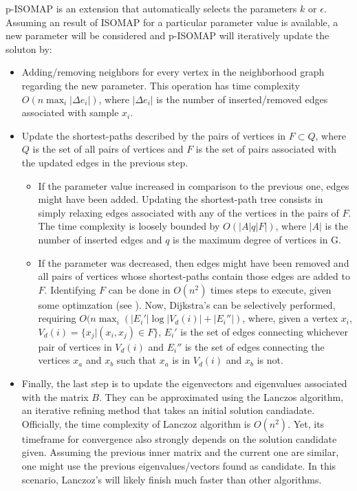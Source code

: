 \documentclass[12pt]{report}
\begin{document}
p-ISOMAP is an extension that automatically selects the parameters $k$ or $\epsilon$. \cite{choo2010p} Assuming an result of ISOMAP for a particular parameter value is available, a new parameter will be considered and p-ISOMAP will iteratively update the soluton by:
\begin{itemize}
	\item Adding/removing neighbors for every vertex in the neighborhood graph regarding the new parameter. This operation has time complexity $O(n \max_i |\Delta e_i|)$, where $|\Delta e_i|$ is the number of inserted/removed edges associated with sample $x_i$.
	
	\item Update the shortest-paths described by the pairs of vertices in $F \subset Q$, where $Q$ is the set of all pairs of vertices and $F$ is the set of pairs associated with the updated edges in the previous step.
	\begin{itemize}
		\item	If the parameter value increased in comparison to the previous one, edges might have been added. Updating the shortest-path tree consists in simply relaxing edges associated with any of the vertices in the pairs of $F$. The time complexity is loosely bounded by $O(|A|q|F|)$, where $|A|$ is the number of inserted edges and $q$ is the maximum degree of vertices in G.
		
		\item If the parameter was decreased, then edges might have been removed and all pairs of vertices whose shortest-paths contain those edges are added to $F$. Identifying $F$ can be done in $O(n^2)$ times steps to execute, given some optimzation (see \cite{choo2010p}). Now, Dijkstra's can be selectively performed, requiring $O(n \max_i (|E_i'| \log |V_d(i)| + |E_i''|)$, where, given a vertex $x_i$, $V_d(i)=\{x_j | (x_i, x_j) \in F\}$, $E_i'$ is the set of edges connecting whichever pair of vertices in $V_d(i)$ and $E_i''$ is the set of edges connecting the vertices $x_a$ and $x_b$ such that $x_a$ is in $V_d(i)$ and $x_b$ is not.
	\end{itemize}

	\item Finally, the last step is to update the eigenvectors and eigenvalues associated with the matrix $B$. They can be approximated using the Lanczos algorithm, an iterative refining method that takes an initial solution candiadate. Officially, the time complexity of Lanczoz algorithm is $O(n^2)$. \cite{chen2004machine} Yet, its timeframe for convergence also strongly depends on the solution candidate given. Assuming the previous inner matrix and the current one are similar, one might use the previous eigenvalues/vectors found as candidate. In this scenario, Lanczoz's will likely finish much faster than other algorithms.
\end{itemize}
\end{document}

